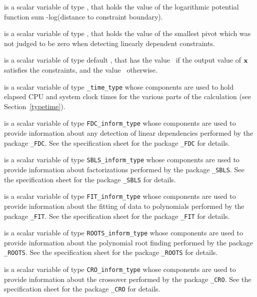 \begin{description}
is a scalar variable of type \realdp,
that holds the value of the logarithmic potential function
sum -log(distance to constraint boundary).

is a scalar variable of type \realdp,
that holds the value of the smallest pivot which was not judged to be 
zero when detecting linearly dependent constraints.

 is a scalar variable of type default \logical, that has the
value \true\ if the output value of ${\mathbf{x}}$ satisfies the constraints,
and the value \false\ otherwise.

 is a scalar variable of type {\tt \packagename\_time\_type}
whose components are used to hold elapsed CPU and system clock times for the
various parts of the calculation (see Section~\ref{typetime}).

 is a scalar variable of type
{\tt FDC\_inform\_type}
whose components are used to provide information about
any detection of linear dependencies
performed by the package
{\tt \libraryname\_FDC}.
See the specification sheet for the package
{\tt \libraryname\_FDC} for details.

 is a scalar variable of type
{\tt SBLS\_inform\_type}
whose components are used to provide information about factorizations
performed by the package
{\tt \libraryname\_SBLS}.
See the specification sheet for the package
{\tt \libraryname\_SBLS} for details.

 is a scalar variable of type
{\tt FIT\_inform\_type}
whose components are used to provide information about the fitting
of data to polynomials performed by the package
{\tt \libraryname\_FIT}.
See the specification sheet for the package
{\tt \libraryname\_FIT} for details.

 is a scalar variable of type
{\tt ROOTS\_inform\_type}
whose components are used to provide information about the
polynomial root finding performed by the package
{\tt \libraryname\_ROOTS}.
See the specification sheet for the package
{\tt \libraryname\_ROOTS} for details.

 is a scalar variable of type
{\tt CRO\_inform\_type}
whose components are used to provide information about the crossover
performed by the package
{\tt \libraryname\_CRO}.
See the specification sheet for the package
{\tt \libraryname\_CRO} for details.

\end{description}
